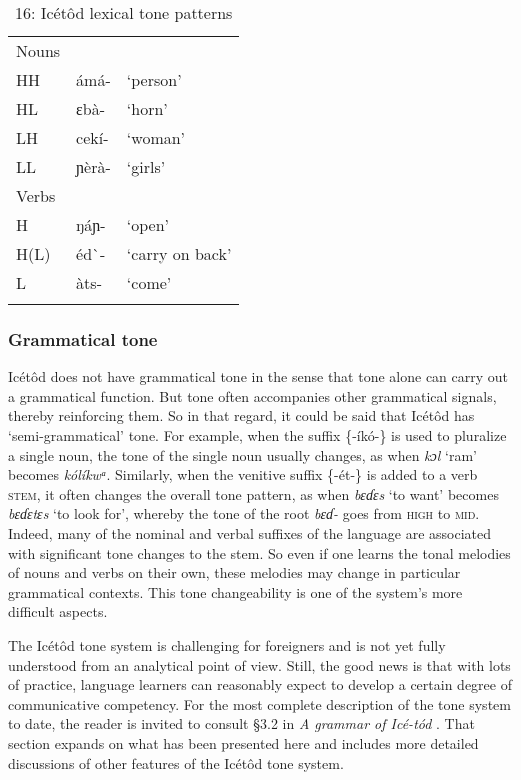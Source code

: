 \begin{table}
\caption{16: Icétôd lexical tone patterns}
\label{tab:2}


\begin{tabularx}{\textwidth}{XXX}
\lsptoprule

Nouns &  & \\
HH & ámá- & ‘person’\\
HL & ɛbà- & ‘horn’\\
LH & cekí- & ‘woman’\\
LL & ɲèrà- & ‘girls’\\
Verbs &  & \\
H & ŋáɲ- & ‘open’\\
H(L) & éd\`{ }- & ‘carry on back’\\
L & àts- & ‘come’\\
\lspbottomrule
\end{tabularx}
\end{table}

\subsubsection{Grammatical tone}

Icétôd does not have grammatical tone in the sense that tone alone can carry out a grammatical function. But tone often accompanies other grammatical signals, thereby reinforcing them. So in that regard, it could be said that Icétôd has ‘semi-grammatical’ tone. For example, when the suffix \{-íkó-\} is used to pluralize a single noun, the tone of the single noun usually changes, as when \textit{kɔl }‘ram’ becomes \textit{kólíkwᵃ}. Similarly, when the venitive suffix \{-ét-\} is added to a verb \textsc{stem}, it often changes the overall tone pattern, as when \textit{bɛɗɛs }‘to want’ becomes \textit{bɛɗɛtɛs} ‘to look for’, whereby the tone of the root \textit{bɛɗ- }goes from \textsc{high }to \textsc{mid}. Indeed, many of the nominal and verbal suffixes of the language are associated with significant tone changes to the stem. So even if one learns the tonal melodies of nouns and verbs on their own, these melodies may change in particular grammatical contexts. This tone changeability is one of the system’s more difficult aspects.

The Icétôd tone system is challenging for foreigners and is not yet fully understood from an analytical point of view. Still, the good news is that with lots of practice, language learners can reasonably expect to develop a certain degree of communicative competency. For the most complete description of the tone system to date, the reader is invited to consult §3.2 in \textit{A grammar of Icé-tód }\citep{Schrock2014}. That section expands on what has been presented here and includes more detailed discussions of other features of the Icétôd tone system.
 
